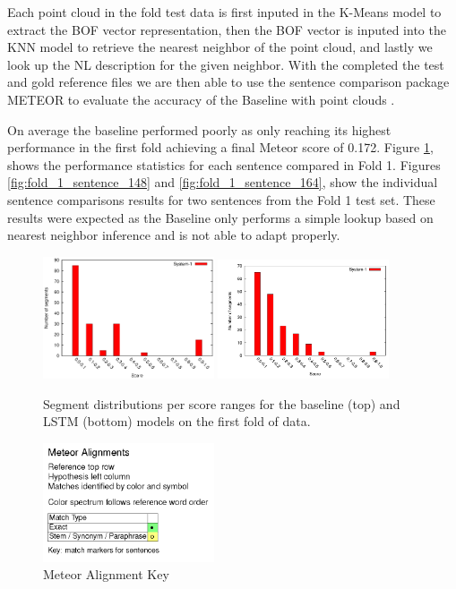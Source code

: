 \documentclass[letterpaper, 12 pt, conference]{ieeeconf}
\begin{document}
Each point cloud in the fold test data is first inputed in the K-Means model to extract the BOF vector representation, then the BOF vector is inputed into the KNN model to retrieve the nearest neighbor of the point cloud, and lastly we look up the NL description for the given neighbor. With the completed the test and gold reference files we are then able to use the sentence comparison package METEOR to evaluate the accuracy of the Baseline with point clouds \cite{Denkowski14meteoruniversal}.

On average the baseline performed poorly as only reaching its highest performance in the first fold achieving a final Meteor score of 0.172. Figure \ref{fig:fold_1_score}, shows the performance statistics for each sentence compared in Fold 1. Figures \ref{fig:fold_1_sentence_148} and \ref{fig:fold_1_sentence_164}, show the individual sentence comparisons results for two sentences from the Fold 1 test set. These results were expected as the Baseline only performs a simple lookup based on nearest neighbor inference and is not able to adapt properly.

\begin{figure}[htb!]
  \centering
  \includegraphics[width=0.45\textwidth]{fold_1_score}
  \includegraphics[width=0.45\textwidth]{lstm_fold_1_score_bar_graph}
  \caption{Segment distributions per score ranges for the baseline (top) and LSTM (bottom) models on the first fold of data.}
  \label{fig:fold_1_score}
\end{figure}

\begin{figure}[htb!]
  \centering
  \includegraphics[width=0.45\textwidth]{meteor_alignment_key}
  \caption{Meteor Alignment Key}
  \label{fig:meteor_alignment_key}
\end{figure}
\end{document}
